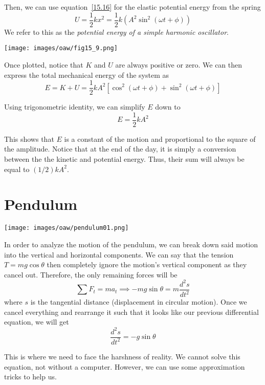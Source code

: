 Then, we can use equation~\eqref{15.16} for the elastic potential energy from the spring
\begin{equation}\label{15.20}
    U = \frac{1}{2}kx^2 = \frac{1}{2}k\left(A^2 \sin^2(\omega t + \phi)\right)
\end{equation}
We refer to this as the \textit{potential energy of a simple harmonic oscillator}.

\begin{center}\label{fig15.9}
\texttt{[image: images/oaw/fig15\_9.png]}
\end{center}
Once plotted, notice that $K$ and $U$ are always positive or zero. We can then express the total
mechanical energy of the system as 
\begin{equation}\label{fullE}
    E = K + U = \frac{1}{2}kA^2\left[ \cos^2(\omega t + \phi) + \sin^2(\omega t + \phi) \right]
\end{equation}

Using trigonometric identity, we can simplify $E$ down to 
\begin{equation}\label{15.21}
    E = \frac{1}{2}kA^2
\end{equation}

This shows that $E$ is a constant of the motion and proportional to the square of the amplitude.
Notice that at the end of the day, it is simply a conversion between the the kinetic and potential
energy. Thus, their sum will always be equal to $(1/2)kA^2$.

\section{Pendulum}

\begin{center}
\texttt{[image: images/oaw/pendulum01.png]}
\end{center}

In order to analyze the motion of the pendulum, we can break down said motion into the vertical and
horizontal components. We can say that the tension $T = mg\cos\theta$ then completely ignore the motion's
vertical component as they cancel out. Therefore, the only remaining forces will be
\[\sum F_t = ma_t \implies -mg\sin\theta = m\frac{d^2s}{dt^2}\]
where $s$ is the tangential distance (displacement in circular motion). Once we cancel everything
and rearrange it such that it looks like our previous differential equation, we will get
\[ \frac{d^2s}{dt^2} = -g\sin\theta \]

This is where we need to face the harshness of reality. We cannot solve this equation, not without
a computer. However, we can use some approximation tricks to help us.

